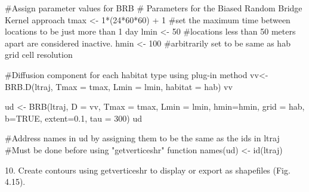 \documentclass[
  letterpaper,
]{book}
\newenvironment{Shaded}{\begin{snugshade}}{\end{snugshade}}
\newcommand{\AttributeTok}[1]{\textcolor[rgb]{0.40,0.45,0.13}{#1}}
\newcommand{\CommentTok}[1]{\textcolor[rgb]{0.37,0.37,0.37}{#1}}
\newcommand{\ConstantTok}[1]{\textcolor[rgb]{0.56,0.35,0.01}{#1}}
\newcommand{\DecValTok}[1]{\textcolor[rgb]{0.68,0.00,0.00}{#1}}
\newcommand{\FloatTok}[1]{\textcolor[rgb]{0.68,0.00,0.00}{#1}}
\newcommand{\FunctionTok}[1]{\textcolor[rgb]{0.28,0.35,0.67}{#1}}
\newcommand{\NormalTok}[1]{\textcolor[rgb]{0.00,0.23,0.31}{#1}}
\newcommand{\OtherTok}[1]{\textcolor[rgb]{0.00,0.23,0.31}{#1}}
\newcommand{\SpecialCharTok}[1]{\textcolor[rgb]{0.37,0.37,0.37}{#1}}
\begin{document}
\begin{Shaded}
\begin{Highlighting}[]
\CommentTok{\#Assign parameter values for BRB }
\CommentTok{\# Parameters for the Biased Random Bridge Kernel approach }
\NormalTok{tmax }\OtherTok{\textless{}{-}} \DecValTok{1}\SpecialCharTok{*}\NormalTok{(}\DecValTok{24}\SpecialCharTok{*}\DecValTok{60}\SpecialCharTok{*}\DecValTok{60}\NormalTok{) }\SpecialCharTok{+} \DecValTok{1} \CommentTok{\#set the maximum time between locations to be just more than 1 day}
\NormalTok{lmin }\OtherTok{\textless{}{-}} \DecValTok{50} \CommentTok{\#locations less than 50 meters apart are considered inactive.   }
\NormalTok{hmin }\OtherTok{\textless{}{-}} \DecValTok{100} \CommentTok{\#arbitrarily set to be same as hab grid cell resolution }

\CommentTok{\#Diffusion component for each habitat type using plug{-}in method}
\NormalTok{vv}\OtherTok{\textless{}{-}} \FunctionTok{BRB.D}\NormalTok{(ltraj, }\AttributeTok{Tmax =}\NormalTok{ tmax, }\AttributeTok{Lmin =}\NormalTok{ lmin,  }\AttributeTok{habitat =}\NormalTok{ hab)}
\NormalTok{vv}

\NormalTok{ud }\OtherTok{\textless{}{-}} \FunctionTok{BRB}\NormalTok{(ltraj, }\AttributeTok{D =}\NormalTok{ vv, }\AttributeTok{Tmax =}\NormalTok{ tmax, }\AttributeTok{Lmin =}\NormalTok{ lmin, }\AttributeTok{hmin=}\NormalTok{hmin, }\AttributeTok{grid =}\NormalTok{ hab, }\AttributeTok{b=}\ConstantTok{TRUE}\NormalTok{, }
  \AttributeTok{extent=}\FloatTok{0.1}\NormalTok{, }\AttributeTok{tau =} \DecValTok{300}\NormalTok{)}
\NormalTok{ud}

\CommentTok{\#Address names in ud by assigning them to be the same as the ids in ltraj}
\CommentTok{\#Must be done before using "getverticeshr" function}
\FunctionTok{names}\NormalTok{(ud) }\OtherTok{\textless{}{-}} \FunctionTok{id}\NormalTok{(ltraj) }
\end{Highlighting}
\end{Shaded}

10. Create contours using getverticeshr to display or export as
shapefiles (Fig. 4.15).
\end{document}
